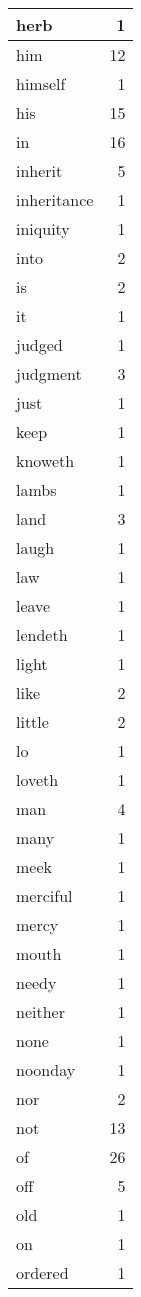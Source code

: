 \begin{center}
\begin{longtable}{l|r}
herb & 1 \\ \hline
him & 12 \\ \hline
himself & 1 \\ \hline
his & 15 \\ \hline
in & 16 \\ \hline
inherit & 5 \\ \hline
inheritance & 1 \\ \hline
iniquity & 1 \\ \hline
into & 2 \\ \hline
is & 2 \\ \hline
it & 1 \\ \hline
judged & 1 \\ \hline
judgment & 3 \\ \hline
just & 1 \\ \hline
keep & 1 \\ \hline
knoweth & 1 \\ \hline
lambs & 1 \\ \hline
land & 3 \\ \hline
laugh & 1 \\ \hline
law & 1 \\ \hline
leave & 1 \\ \hline
lendeth & 1 \\ \hline
light & 1 \\ \hline
like & 2 \\ \hline
little & 2 \\ \hline
lo & 1 \\ \hline
loveth & 1 \\ \hline
man & 4 \\ \hline
many & 1 \\ \hline
meek & 1 \\ \hline
merciful & 1 \\ \hline
mercy & 1 \\ \hline
mouth & 1 \\ \hline
needy & 1 \\ \hline
neither & 1 \\ \hline
none & 1 \\ \hline
noonday & 1 \\ \hline
nor & 2 \\ \hline
not & 13 \\ \hline
of & 26 \\ \hline
off & 5 \\ \hline
old & 1 \\ \hline
on & 1 \\ \hline
ordered & 1 \\ \hline

\end{longtable}
\end{center}
